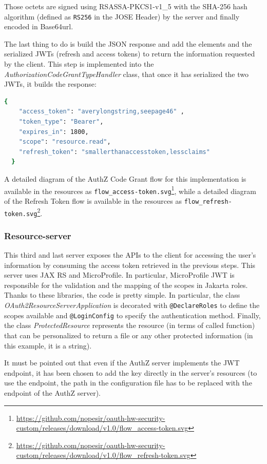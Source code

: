 \noindent Those octets are signed using RSASSA-PKCS1-v1\_5 with the SHA-256 hash algorithm (defined as \texttt{RS256} in the JOSE Header) by the server and finally encoded in Base64url.

The last thing to do is build the JSON response and add the elements and the serialized JWTs (refresh and access tokens) to return the information requested by the client. This step is implemented into the \textit{AuthorizationCodeGrantTypeHandler} class, that once it has serialized the two JWTs, it builds the response:

\begin{lstlisting}[language=bash, basicstyle=\fontsize{12}{14}\ttfamily]
  {
    "access_token": "averylongstring,seepage46" ,
    "token_type": "Bearer",  
    "expires_in": 1800,
    "scope": "resource.read",
    "refresh_token": "smallerthanaccesstoken,lessclaims"
  }
\end{lstlisting}

A detailed diagram of the AuthZ Code Grant flow for this implementation is available in the resources as \texttt{flow\_access-token.svg}\footnote{\url{https://github.com/nopesir/oauth-hw-security-custom/releases/download/v1.0/flow_access-token.svg}}, while a detailed diagram of the Refresh Token flow is available in the resources as \texttt{flow\_refresh-token.svg}\footnote{\url{https://github.com/nopesir/oauth-hw-security-custom/releases/download/v1.0/flow_refresh-token.svg}}.

\subsubsection{Resource-server}
This third and last server exposes the APIs to the client for accessing the user's information by consuming the access token retrieved in the previous steps. This server uses JAX RS and MicroProfile. In particular, MicroProfile JWT is responsible for the validation and the mapping of the scopes in Jakarta roles. Thanks to these libraries, the code is pretty simple. In particular, the class \textit{OAuth2ResourceServerApplication} is decorated with \texttt{@DeclareRoles} to define the scopes available and \texttt{@LoginConfig} to specify the authentication method. Finally, the class \textit{ProtectedResource} represents the resource (in terms of called function) that can be personalized to return a file or any other protected information (in this example, it is a string).

It must be pointed out that even if the AuthZ server implements the JWT endpoint, it has been chosen to add the key directly in the server's resources (to use the endpoint, the path in the configuration file has to be replaced with the endpoint of the AuthZ server).

